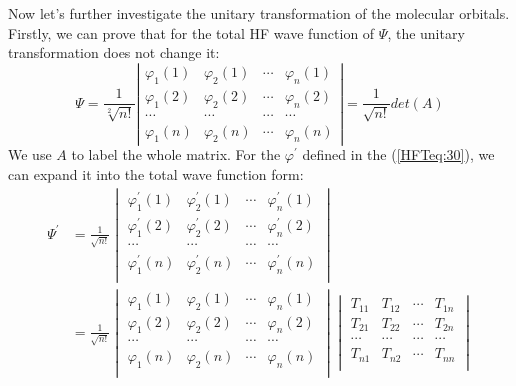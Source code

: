 Now let's further investigate the unitary transformation of the
molecular orbitals. Firstly, we can prove that for the total HF wave
function of $\Psi$, the unitary transformation does not change it:
\begin{equation}\label{}
\Psi = \frac{1}{\sqrt[2]{n!}} \left | \begin{array}{cccc}
  \varphi_{1}(1) & \varphi_{2}(1) & \cdots & \varphi_{n}(1) \\
  \varphi_{1}(2) & \varphi_{2}(2) & \cdots & \varphi_{n}(2) \\
  \cdots & \cdots & \cdots & \cdots                        \\
  \varphi_{1}(n) & \varphi_{2}(n) & \cdots & \varphi_{n}(n)
\end{array} \right | = \frac{1}{\sqrt{n!}} det(A)
\end{equation}
We use $A$ to label the whole matrix. For the $\varphi^{'}$ defined
in the (\ref{HFTeq:30}), we can expand it into the total wave
function form:
\begin{align}\label{}
\Psi^{'} &= \frac{1}{\sqrt{n!}}\begin{vmatrix}
          \varphi^{'}_{1}(1) & \varphi^{'}_{2}(1) & \cdots & \varphi^{'}_{n}(1)
\\
          \varphi^{'}_{1}(2) & \varphi^{'}_{2}(2) & \cdots & \varphi^{'}_{n}(2)
\\
          \cdots & \cdots & \cdots & \cdots   \\
          \varphi^{'}_{1}(n) & \varphi^{'}_{2}(n) & \cdots & \varphi^{'}_{n}(n)
\\
        \end{vmatrix} \nonumber \\
&=\frac{1}{\sqrt{n!}}\begin{vmatrix}
          \varphi_{1}(1) & \varphi_{2}(1) & \cdots & \varphi_{n}(1) \\
          \varphi_{1}(2) & \varphi_{2}(2) & \cdots & \varphi_{n}(2) \\
          \cdots & \cdots & \cdots & \cdots   \\
          \varphi_{1}(n) & \varphi_{2}(n) & \cdots & \varphi_{n}(n) \\
        \end{vmatrix}
        \begin{vmatrix}
          T_{11} & T_{12} & \cdots & T_{1n} \\
          T_{21} & T_{22} & \cdots & T_{2n} \\
          \cdots & \cdots & \cdots & \cdots   \\
          T_{n1} & T_{n2} & \cdots & T_{nn} \\
        \end{vmatrix}
\end{align}
